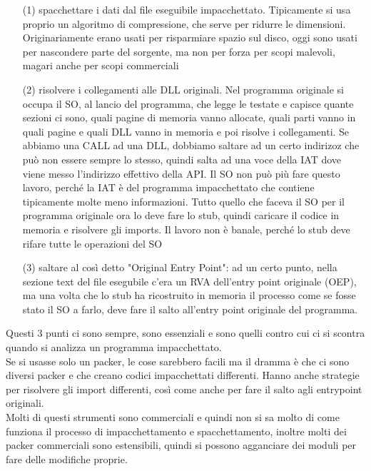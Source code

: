 \documentclass[12pt, oneside]{extbook}
\begin{document}
\begin{itemize}
\item[(1)] spacchettare i dati dal file eseguibile impacchettato. Tipicamente si usa proprio un algoritmo di compressione, che serve per ridurre le dimensioni. Originariamente erano usati per risparmiare spazio sul disco, oggi sono usati per nascondere parte del sorgente, ma non per forza per scopi malevoli, magari anche per scopi commerciali
\item[(2)] risolvere i collegamenti alle DLL originali. Nel programma originale si occupa il SO, al lancio del programma, che legge le testate e capisce quante sezioni ci sono, quali pagine di memoria vanno allocate, quali parti vanno in quali pagine e quali DLL vanno in memoria e poi risolve i collegamenti. Se abbiamo una CALL ad una DLL, dobbiamo saltare ad un certo indirizoz che può non essere sempre lo stesso, quindi salta ad una voce della IAT dove viene messo l'indirizzo effettivo della API. Il SO non può più fare questo lavoro, perché la IAT è del programma impacchettato che contiene tipicamente molte meno informazioni. Tutto quello che faceva il SO per il programma originale ora lo deve fare lo stub, quindi caricare il codice in memoria e risolvere gli imports. Il lavoro non è banale, perché lo stub deve rifare tutte le operazioni del SO
\item[(3)]saltare al così detto "Original Entry Point": ad un certo punto, nella sezione text del file esegubile c'era un RVA dell'entry point originale (OEP), ma una volta che lo stub ha ricostruito in memoria il processo come se fosse stato il SO a farlo, deve fare il salto all'entry point originale del programma.
\end{itemize}
Questi 3 punti ci sono sempre, sono essenziali e sono quelli contro cui ci si scontra quando si analizza un programma impacchettato.\\Se si usasse solo un packer, le cose sarebbero facili ma il dramma è che ci sono diversi packer e che creano codici impacchettati differenti. Hanno anche strategie per risolvere gli import differenti, così come anche per fare il salto agli entrypoint originali.\\Molti di questi strumenti sono commerciali e quindi non si sa molto di come funziona il processo di impacchettamento e spacchettamento, inoltre molti dei packer commerciali sono estensibili, quindi si possono agganciare dei moduli per fare delle modifiche proprie.
\end{document}
